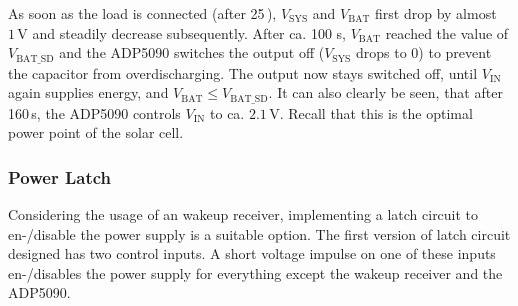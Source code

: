 As soon as the load is connected (after 25\,), $V_{\text{SYS}}$ and $V_{\text{BAT}}$ first drop by almost $1\,\text{V}$ and steadily decrease subsequently.
After ca. 100 s, $V_{\text{BAT}}$ reached the value of $V_{\text{BAT\_SD}}$ and the ADP5090 switches the output off ($V_{\text{SYS}}$ drops to 0) to prevent the capacitor from overdischarging.
The output now stays switched off, until $V_{\text{IN}}$ again supplies energy, and $V_{\text{BAT}} \le V_{\text{BAT\_SD}}$.
It can also clearly be seen, that after 160\,s, the ADP5090 controls $V_{\text{IN}}$ to ca. $2.1\,\text{V}$. Recall that this is the optimal power point of the solar cell.

\subsubsection{Power Latch}
Considering the usage of an wakeup receiver, implementing a latch circuit to en-/disable the power supply is a suitable option. The first version of latch circuit designed has two control inputs. A short voltage impulse on one of these inputs en-/disables the power supply for everything except the wakeup receiver and the ADP5090. 
